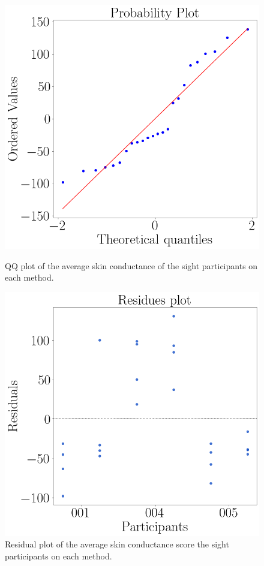 \begin{figure}[!htb]
    \centering
    \begin{minipage}{0.45\textwidth}
        \centering
        \includegraphics[width = 0.8\linewidth]{Resultados/GSR/Figuras/png/qqplot_gsr_two_way_sight.png}
        \caption{QQ plot of the average skin conductance of the sight participants on each method.}
        \label{fig:qqplot_gsr_two_way_sight}
    \end{minipage}
    \begin{minipage}{0.45\textwidth}
        \centering
        \includegraphics[width = 0.8\linewidth]{Resultados/GSR/Figuras/png/residplot_gsr_two_way_sight.png}
        \caption{Residual plot of the average skin conductance score the sight participants on each method.}
        \label{fig:residplot_gsr_two_way_sight}
    \end{minipage}
\end{figure}


